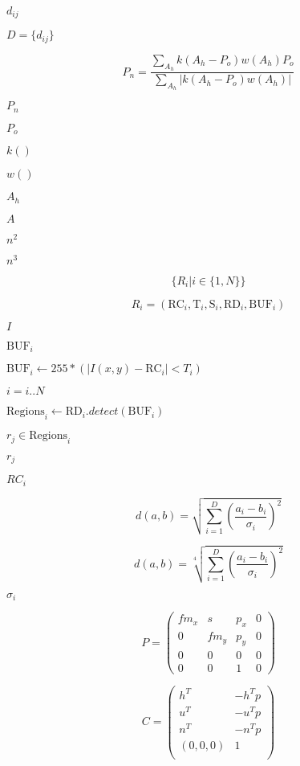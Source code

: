 \documentclass{article}
\begin{document}
$d_{ij}$
\pagebreak

$D=\{d_{ij}\}$
\pagebreak

\[P_n = \frac{\sum_{A_h}k(A_h-P_o)w(A_h)P_o}{\sum_{A_h} | k(A_h-P_o) w(A_h)|} \]
\pagebreak

$P_n $
\pagebreak

$P_o $
\pagebreak

$k() $
\pagebreak

$w() $
\pagebreak

$A_h $
\pagebreak

$A$
\pagebreak

$n^2$
\pagebreak

$n^3$
\pagebreak

\[\{R_i | i \in \{1,N\} \}\]
\pagebreak

\[R_i=(\mbox{RC}_i,\mbox{T}_i,\mbox{S}_i,\mbox{RD}_i, \mbox{BUF}_i)\]
\pagebreak

$I$
\pagebreak

$\mbox{BUF}_i$
\pagebreak

$ \mbox{BUF}_i \leftarrow 255 * ( |I(x,y)-\mbox{RC}_i| < T_i )$
\pagebreak

$i = i .. N$
\pagebreak

$\mbox{Regions}_i \leftarrow \mbox{RD}_i.detect(\mbox{BUF}_i)$
\pagebreak

$r_j \in \mbox{Regions}_i$
\pagebreak

$r_j$
\pagebreak

$RC_i$
\pagebreak

\[ d(a,b) = \sqrt{ \sum\limits_{i=1}^D \left( \frac{a_i - b_i}{\sigma_i}\right)^2 } \]
\pagebreak

\[ d(a,b) = \sqrt[4]{ \sum\limits_{i=1}^D \left( \frac{a_i - b_i}{\sigma_i}\right)^2 } \]
\pagebreak

$\sigma_i$
\pagebreak

\[ P = \left(\begin{array}{cccc} fm_x & s & p_x & 0 \\ 0 & f m_y & p_y & 0 \\ 0 & 0 & 0 & 0 \\ 0 & 0 & 1 & 0 \end{array}\right) \]
\pagebreak

\[ C = \left(\begin{array}{cc} h^T & -h^T p \\ u^T & -u^T p \\ n^T & -n^T p \\ (0,0,0) & 1 \\ \end{array}\right) \]
\pagebreak
\end{document}
